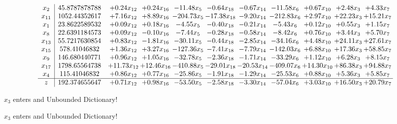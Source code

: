 \documentclass[9pt]{article}
\begin{document}
 \[\begin{array}{c| c c@{\hskip 2pt} c@{\hskip 2pt} c@{\hskip 2pt} c@{\hskip 2pt} c@{\hskip 2pt} c@{\hskip 2pt} c@{\hskip 2pt} c@{\hskip 2pt} c@{\hskip 2pt} }
 x_{2}   &  45.8787878788 & +  0.24 x_{12} & +  0.24 x_{16} & -11.48 x_{5} & -0.64 x_{18} & -0.67 x_{14} & -11.58 x_{6} & +  0.67 x_{10} & +  2.48 x_{3} & +  4.33 x_{7}\\
 x_{11}   &  1052.44352617 & +  7.16 x_{12} & +  8.89 x_{16} & -204.73 x_{5} & -17.38 x_{18} & -9.20 x_{14} & -212.83 x_{6} & +  2.97 x_{10} & + 22.23 x_{3} & + 15.21 x_{7}\\
 x_{1}   &  23.8622589532 & +  0.09 x_{12} & +  0.18 x_{16} & -4.55 x_{5} & -0.40 x_{18} & -0.21 x_{14} & -5.43 x_{6} & +  0.12 x_{10} & +  0.55 x_{3} & +  1.15 x_{7}\\
 x_{8}   &  22.6391184573 & +  0.09 x_{12} & -0.10 x_{16} & -7.44 x_{5} & -0.28 x_{18} & -0.58 x_{14} & -8.42 x_{6} & +  0.76 x_{10} & +  3.44 x_{3} & +  5.70 x_{7}\\
 x_{13}   &  55.7217630854 & +  0.83 x_{12} & -1.81 x_{16} & -30.11 x_{5} & -0.44 x_{18} & -2.85 x_{14} & -34.16 x_{6} & +  4.48 x_{10} & + 24.11 x_{3} & + 27.61 x_{7}\\
 x_{15}   &  578.41046832 & +  1.36 x_{12} & +  3.27 x_{16} & -127.36 x_{5} & -7.41 x_{18} & -7.79 x_{14} & -142.03 x_{6} & +  6.88 x_{10} & + 17.36 x_{3} & + 58.85 x_{7}\\
 x_{9}   &  146.680440771 & +  0.96 x_{12} & +  1.05 x_{16} & -32.78 x_{5} & -2.36 x_{18} & -1.71 x_{14} & -33.29 x_{6} & +  1.12 x_{10} & +  6.28 x_{3} & +  8.15 x_{7}\\
 x_{17}   &  1798.65564738 & + 11.73 x_{12} & + 12.46 x_{16} & -410.88 x_{5} & -29.01 x_{18} & -20.53 x_{14} & -409.07 x_{6} & + 14.30 x_{10} & + 86.38 x_{3} & + 94.88 x_{7}\\
 x_{4}   &  115.41046832 & +  0.86 x_{12} & +  0.77 x_{16} & -25.86 x_{5} & -1.91 x_{18} & -1.29 x_{14} & -25.53 x_{6} & +  0.88 x_{10} & +  5.36 x_{3} & +  5.85 x_{7}\\
\hline
z    &  192.374655647 & +  0.71 x_{12} & +  0.98 x_{16} & -53.50 x_{5} & -2.58 x_{18} & -3.30 x_{14} & -57.04 x_{6} & +  3.03 x_{10} & + 16.50 x_{3} & + 20.79 x_{7}\\
\end{array}\]


 $ x_{3} $ enters and Unbounded Dictionary!


 $ x_{3} $ enters and Unbounded Dictionary!
\end{document}
